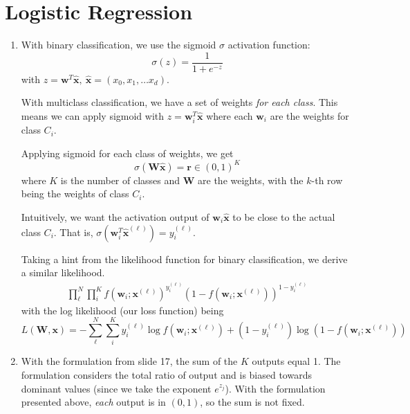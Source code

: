 \newpage
\section{Logistic Regression}

\begin{enumerate}[label=(\alph*)]
	\item With binary classification, we use the sigmoid $\sigma$ activation function:
	      \[\sigma(z) = \frac{1}{1 + e^{-z}}\]
	      with $z = \bm{w}^T \bm{\hat x}, \ \bm{\hat x} = (x_0, x_1, \dots x_d)$.

	      With multiclass classification, we have a set of weights \textit{for each class}.
	      This means we can apply sigmoid with $z = \bm{w}_i^T \bm{\hat x}$ where each
	      $\bm{w}_i$ are the weights for class $C_i$.

	      Applying sigmoid for each class of weights, we get
	      \[ \sigma(\bm{W} \bm{\hat x}) = \bm{r} \in (0, 1)^K \]
	      where $K$ is the number of classes and $\bm{W}$ are the weights,
	      with the $k$-th row being the weights of class $C_i$.

	      Intuitively, we want the activation output of $\bm{w}_i \bm{\hat x}$ to be close to
	      the actual class $C_i$. That is, $\sigma(\bm{w}_i^T \bm{\hat x}^{(\ell)}) = y_i^{(\ell)}$.

	      Taking a hint from the likelihood function for binary classification, we derive a similar likelihood.
	      \begin{align*}
		      \prod_{\ell}^N \prod_{i}^K f(\bm{w}_i; \bm{x}^{(\ell)})^{y_i^{(\ell)}} (1 - f(\bm{w}_i; \bm{x}^{(\ell)}))^{1 - y_i^{(\ell)}}
	      \end{align*}
	      with the log likelihood (our loss function) being
	      \[
		      L(\bm{W}, \bm{x}) = -\sum_{\ell}^N \sum_{i}^K y_i^{(\ell)} \log f(\bm{w}_i; \bm{x}^{(\ell)}) + (1 - y_i^{(\ell)}) \log (1 - f(\bm{w}_i; \bm{x}^{(\ell)}))
	      \]

	\item With the formulation from slide 17, the sum of the $K$ outputs equal 1. The formulation considers
	      the total ratio of output and is biased towards dominant values (since we take the exponent $e^{z_j}$).
	      With the formulation presented above, \textit{each} output is in $(0, 1)$, so the sum is not fixed.


\end{enumerate}
